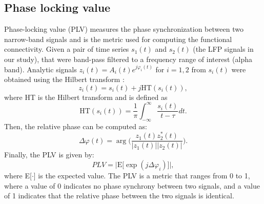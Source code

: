 \documentclass[../main.tex]{subfiles}
\begin{document}
\subsection{Phase locking value}
Phase-locking value (PLV) measures the phase synchronization between two narrow-band signals and is the metric used for computing the functional connectivity.
Given a pair of time series $s_1(t)$ and $s_2(t)$ (the LFP signals in our study), that were band-pass filtered to a frequency range of interest (alpha band).
Analytic signals $z_i(t) = A_i(t)e^{j\varphi_i(t)}$ for $i = {1, 2}$ from $s_i(t)$ were obtained using the Hilbert transform \citep{cohen_time-frequency_1995}:
\begin{equation}
    z_i(t) = s_i(t) + j\text{HT}(s_i(t)),
    \label{eq:analytic-signal}
\end{equation}
where HT is the Hilbert transform and is defined as 
\begin{equation}
    \text{HT}(s_i(t)) = \displaystyle\frac{1}{\pi}\displaystyle\int_{-\infty}^{\infty}\displaystyle\frac{s_i(t)}{t-\tau} dt.
    \label{eq:hilbert-transform}
\end{equation}
Then, the relative phase can be computed as:
\begin{equation}
    \Delta\varphi(t) = \arg\Bigg(\displaystyle\frac{z_1(t)z_2^{*}(t)}{|z_1(t)||z_2(t)|} \Bigg).
    \label{eq:phase-diff}
\end{equation}
Finally, the PLV is given by:
\begin{equation}
    PLV = \big|\text{E}\big [ \exp{(j\Delta\varphi_i)} \big] \big|,
    \label{eq:plv}
\end{equation}
\clearpage
where E[$\cdot$] is the expected value.
The PLV is a metric that ranges from 0 to 1, where a value of 0 indicates no phase synchrony between two signals, and a value of 1 indicates that the relative phase between the two signals is identical.

\end{document}
